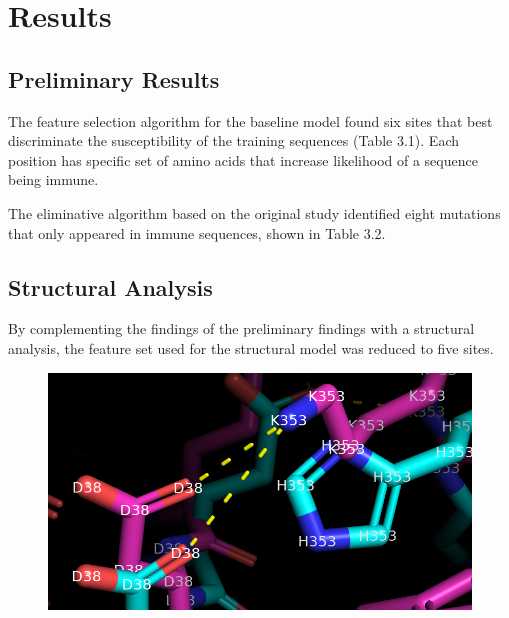 \section{Results}

\subsection{Preliminary Results}

The feature selection algorithm for the baseline model found six sites that best discriminate the susceptibility of the training sequences (Table 3.1). Each position has specific set of amino acids that increase likelihood of a sequence being immune.



The eliminative algorithm based on the original study identified eight mutations that only appeared in immune sequences, shown in Table 3.2.



\subsection{Structural Analysis}

By complementing the findings of the preliminary findings with a structural analysis, the feature set used for the structural model was reduced to five sites. 

\begin{figure}[ht!]
    \centering
    \includegraphics[width=\textwidth]{figures/structure-353.png}
\end{figure}

